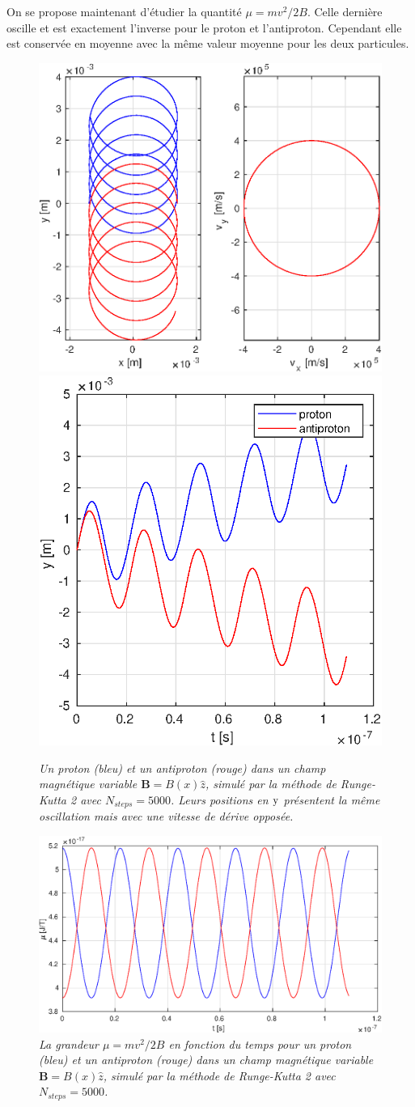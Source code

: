 \documentclass[a4paper,12pt,oneside]{article}
\begin{document}
On se propose maintenant d'étudier la quantité $\mu = mv^2/2B$. Celle dernière oscille et est exactement l'inverse pour le proton et l'antiproton. Cependant elle est conservée en moyenne avec la même valeur moyenne pour les deux particules.

\begin{figure}[H]
\centerline{
\includegraphics[width=0.533\linewidth,angle=0]{application2/comparaisonTrajectoire2}
\includegraphics[width=0.45\linewidth,angle=0]{application2/comparaisonY2}}
\caption{ \label{comparaison2}\em
 Un proton (bleu) et un antiproton (rouge) dans un champ magnétique variable $\textbf{B}=B(x) \hat{z}$, simulé par la méthode de Runge-Kutta 2 avec $N_{steps}=5000$. Leurs positions en $\rm y$ présentent la même oscillation mais avec une vitesse de dérive opposée. 
}
\end{figure}

\begin{figure}[H]
\centerline{\includegraphics[width=0.9\linewidth,angle=0]{application2/comparaisonMu2}}
\caption{ \label{comparaisonMu2}\em
 La grandeur $\mu=mv^2/2B$ en fonction du temps pour un proton (bleu) et un antiproton (rouge) dans un champ magnétique variable $\textbf{B}=B(x) \hat{z}$, simulé par la méthode de Runge-Kutta 2 avec $N_{steps}=5000$.
}
\end{figure}
\end{document}
